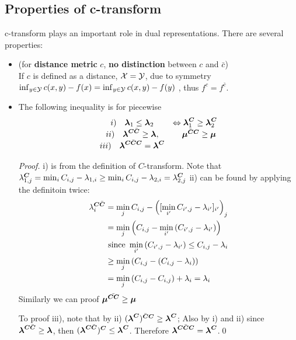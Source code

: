 \documentclass[11pt]{article}
\begin{document}
\subsection{Properties of c-transform}
c-transform plays an important role in dual representations. There are several properties:
\begin{itemize}
\item (for \textbf{distance metric} $c$, \textbf{no distinction} between $c$ and $\bar{c}$)\\
 If $c$ is defined as a distance, ${\mathcal X} = {\mathcal Y}$, due to symmetry $\inf_{y\in {\mathcal Y}}c(x, y) - f(x) = \inf_{y\in {\mathcal Y}}c(x, y) - f(y)$ , thus $f^{c} = f^{\bar{c}}$.

\item The following inequality is for piecewise
 \begin{align*}
 \begin{array}{cc}
 i) \quad \boldsymbol{\lambda}_{1} \le \boldsymbol{\lambda}_{2} &\Leftrightarrow  \boldsymbol{\lambda}_{1}^{\boldsymbol{C}} \ge \boldsymbol{\lambda}_{2}^{\boldsymbol{C}} \\
ii) \quad \boldsymbol{\lambda}^{\boldsymbol{C}\bar{\boldsymbol{C}}} \ge \boldsymbol{\lambda}, &\quad  \boldsymbol{\mu}^{\bar{\boldsymbol{C}}\boldsymbol{C}} \ge \boldsymbol{\mu} \\
iii) \quad  \boldsymbol{\lambda}^{\boldsymbol{C}\bar{\boldsymbol{C}}\boldsymbol{C}} =  \boldsymbol{\lambda}^{\boldsymbol{C}} &
 \end{array}
\end{align*}
\begin{proof}
i) is from the definition of $C$-transform. Note that $\lambda_{1,j}^{\boldsymbol{C}} = \min_{i}C_{i,j} - \lambda_{1,i} \ge  \min_{i}C_{i,j} - \lambda_{2,i} = \lambda_{2,j}^{\boldsymbol{C}}$
ii) can be found by applying the definitoin twice:
\begin{align*}
\lambda_{i}^{\boldsymbol{C}\bar{\boldsymbol{C}}} &=\min_{j}C_{i,j} - \left( [\min_{i'}C_{i',j} - \lambda_{i'}]_{i'}\right)_{j} \\
&=\min_{j}\left(C_{i,j} - \min_{i'}\left(C_{i',j} - \lambda_{i'}\right)\right) \\
&\text{ since }\min_{i'}\left(C_{i',j} - \lambda_{i'}\right) \le C_{i,j} - \lambda_{i}\\
&\ge \min_{j}\left(C_{i,j} - \left(C_{i,j} - \lambda_{i}\right)\right) \\
&= \min_{j}\left(C_{i,j} - C_{i,j}\right) +  \lambda_{i} =  \lambda_{i}
\end{align*}
Similarly we can proof $\boldsymbol{\mu}^{\bar{\boldsymbol{C}\boldsymbol{C}}} \ge \boldsymbol{\mu}$

To proof iii), note that by ii) $ (\boldsymbol{\lambda}^{\boldsymbol{C}})^{\bar{\boldsymbol{C}}\boldsymbol{C}} \ge  \boldsymbol{\lambda}^{\boldsymbol{C}}$; Also by i) and ii) since $\boldsymbol{\lambda}^{\boldsymbol{C}\bar{\boldsymbol{C}}} \ge \boldsymbol{\lambda}$, then $(\boldsymbol{\lambda}^{\boldsymbol{C}\bar{\boldsymbol{C}}})^{\boldsymbol{C}}  \le \boldsymbol{\lambda}^{\boldsymbol{C}}$. Therefore $ \boldsymbol{\lambda}^{\boldsymbol{C}\bar{\boldsymbol{C}}\boldsymbol{C}} =  \boldsymbol{\lambda}^{\boldsymbol{C}}$.\qed
\end{proof}


\end{itemize}
\end{document}
